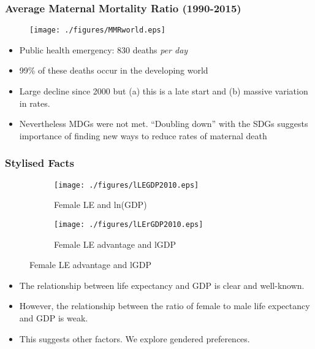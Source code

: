 \documentclass[9pt,letterpaper,subeqn]{beamer}
\begin{document}

\begin{frame}[label=MMRmap]
\frametitle{Average Maternal Mortality Ratio (1990-2015)}
\begin{figure}[h!]
\centering
\texttt{[image: ./figures/MMRworld.eps]}
\end{figure}
\begin{itemize}
\item Public health emergency: 830 deaths \emph{per day}
\item 99\% of these deaths occur in the developing world
\item Large decline since 2000 but (a) this is a late start and (b) massive variation in rates.
\item Nevertheless MDGs were not met.  ``Doubling down'' with the SDGs suggests
  importance of finding new ways to reduce rates of maternal death
\end{itemize}
\end{frame}


\begin{frame}[label=CC1]
\frametitle{Stylised Facts}
\begin{figure}[htpb!]
\centering
\begin{subfigure}{.5\textwidth}
  \centering
  \texttt{[image: ./figures/lLEGDP2010.eps]}
  \caption{Female LE and ln(GDP)}
  \label{TWINfig:fertrend}
\end{subfigure}%
\begin{subfigure}{.5\textwidth}
  \centering
  \texttt{[image: ./figures/lLErGDP2010.eps]}
  \caption{Female LE advantage and lGDP}
  \label{TWINfig:eductrend}
\end{subfigure}
\end{figure}
\begin{itemize}
\item The relationship between life expectancy and GDP is clear and well-known.
\item However, the relationship between the ratio of female to male life expectancy and GDP is weak.
\item This suggests other factors.  We explore gendered preferences.
\end{itemize}
\end{frame}
\end{document}
